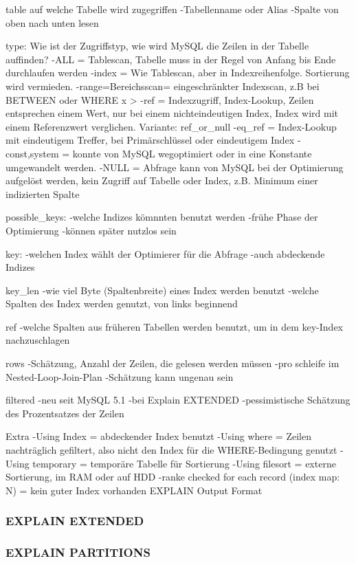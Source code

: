 table
auf welche Tabelle wird zugegriffen
-Tabellenname oder Alias
-Spalte von oben nach unten lesen

type:
Wie ist der Zugriffstyp, wie wird MySQL die Zeilen in der Tabelle auffinden?
-ALL = Tablescan, Tabelle muss in der Regel von Anfang bis Ende durchlaufen werden
-index = Wie Tablescan, aber in Indexreihenfolge. Sortierung wird vermieden.
-range=Bereichsscan= eingeschränkter Indexscan, z.B bei BETWEEN oder WHERE x >
-ref = Indexzugriff, Index-Lookup, Zeilen entsprechen einem Wert, nur bei einem nichteindeutigen Index, Index wird mit einem Referenzwert verglichen. Variante: ref\_or\_null
-eq\_ref = Index-Lookup mit eindeutigem Treffer, bei Primärschlüssel oder eindeutigem Index
-const,system = konnte von MySQL wegoptimiert oder in eine Konstante umgewandelt werden.
-NULL = Abfrage kann von MySQL bei der Optimierung aufgelöst werden, kein Zugriff auf Tabelle oder Index, z.B. Minimum einer indizierten Spalte

possible\_keys:
-welche Indizes kömnnten benutzt werden
-frühe Phase der Optimierung
-können später nutzlos sein

key:
-welchen Index wählt der Optimierer für die Abfrage
-auch abdeckende Indizes

key\_len
-wie viel Byte (Spaltenbreite) eines Index werden benutzt
-welche Spalten des Index werden genutzt, von links beginnend

ref
-welche Spalten aus früheren Tabellen werden benutzt, um in dem key-Index nachzuschlagen

rows
-Schätzung, Anzahl der Zeilen, die gelesen werden müssen
-pro schleife im Nested-Loop-Join-Plan
-Schätzung kann ungenau sein

filtered
-neu seit MySQL 5.1
-bei Explain EXTENDED
-pessimistische Schätzung des Prozentsatzes der Zeilen

Extra
-Using Index = abdeckender Index benutzt
-Using where = Zeilen nachträglich gefiltert, also nicht den Index für die WHERE-Bedingung genutzt
-Using temporary = temporäre Tabelle für Sortierung
-Using filesort = externe Sortierung, im RAM oder auf HDD
-ranke checked for each record (index map: N) = kein guter Index vorhanden
EXPLAIN Output Format \cite{refman2}

\subsubsection{EXPLAIN EXTENDED}
\subsubsection{EXPLAIN PARTITIONS}

